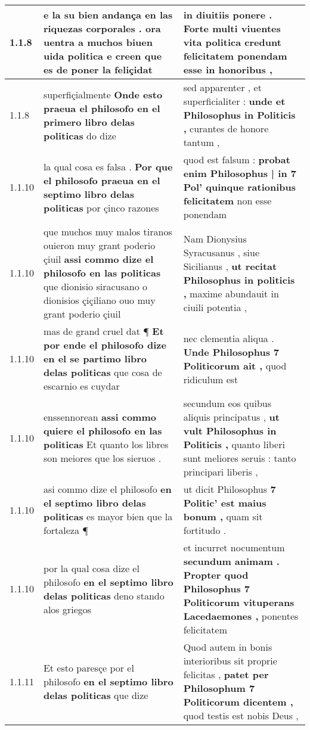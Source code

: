 \begin{tabular}{|p{1cm}|p{6.5cm}|p{6.5cm}|}
1.1.8 & e la su bien andança en las riquezas corporales . \textbf{ ora uentra a muchos biuen uida politica } e creen que es de poner la feliçidat & in diuitiis ponere . \textbf{ Forte multi viuentes vita politica credunt } felicitatem ponendam esse in honoribus , \\\hline
1.1.8 & superfiçialmente \textbf{ Onde esto praeua el philosofo en el primero libro delas politicas } do dize & sed apparenter , et superficialiter : \textbf{ unde et Philosophus in Politicis , } curantes de honore tantum , \\\hline
1.1.10 & la qual cosa es falsa . \textbf{ Por que el philosofo praeua en el septimo libro delas politicas } por çinco razones & quod est falsum : \textbf{ probat enim Philosophus | in 7 Pol’ quinque rationibus felicitatem } non esse ponendam \\\hline
1.1.10 & que muchos muy malos tiranos ouieron muy grant poderio çiuil \textbf{ assi commo dize el philosofo en las politicas } que dionisio siracusano o dionisios çiçiliano ouo muy grant poderio çiuil & Nam Dionysius Syracusanus , siue Sicilianus , \textbf{ ut recitat Philosophus in politicis , } maxime abundauit in ciuili potentia , \\\hline
1.1.10 & mas de grand cruel dat ¶ \textbf{ Et por ende el philosofo dize en el se partimo libro delas politicas } que cosa de escarnio es cuydar & nec clementia aliqua . \textbf{ Unde Philosophus 7 Politicorum ait , } quod ridiculum est \\\hline
1.1.10 & enssennorean \textbf{ assi commo quiere el philosofo en las politicas } Et quanto los libres son meiores que los sieruos . & secundum eos quibus aliquis principatus , \textbf{ ut vult Philosophus in Politicis , } quanto liberi sunt meliores seruis : tanto principari liberis , \\\hline
1.1.10 & asi commo dize el philosofo \textbf{ en el septimo libro delas politicas } es mayor bien que la fortaleza ¶ & ut dicit Philosophus \textbf{ 7 Politic’ est maius bonum , } quam sit fortitudo . \\\hline
1.1.10 & por la qual cosa dize el philosofo \textbf{ en el septimo libro delas politicas } deno stando alos griegos & et incurret nocumentum \textbf{ secundum animam . Propter quod Philosophus 7 Politicorum vituperans Lacedaemones , } ponentes felicitatem \\\hline
1.1.11 & Et esto paresçe por el philosofo \textbf{ en el septimo libro delas politicas } que dize & Quod autem in bonis interioribus sit proprie felicitas , \textbf{ patet per Philosophum 7 Politicorum dicentem , } quod testis est nobis Deus , \\\hline

\end{tabular}
